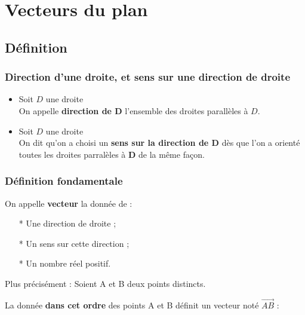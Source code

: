 \vspace*{-1.5cm}
\section{Vecteurs du plan}

\subsection{Définition}

\subsubsection{Direction d'une droite, et sens sur une direction de droite}

\begin{itemize}
\item Soit $D$ une droite \\ On appelle \textbf{direction de D} l'ensemble des droites parallèles à $D$.

\item Soit $D$ une droite \\ On dit qu'on a choisi un \textbf{sens sur la direction de $\mathbf{D}$} dès que l'on a orienté toutes les droites  parralèles à $\mathbf{D}$ de la même façon.
\end{itemize}

\subsubsection{Définition fondamentale}

On appelle \textbf{vecteur} la donnée de : \\

\begin{itemize}
\item[*] Une direction de droite ;
\item[*] Un sens sur cette direction ;
\item[*] Un nombre réel positif. \\


\end{itemize}

Plus précisément : Soient A et B deux points distincts.

La donnée \textbf{dans cet ordre} des points A et B définit un vecteur noté $\overrightarrow{AB}$ : \\


